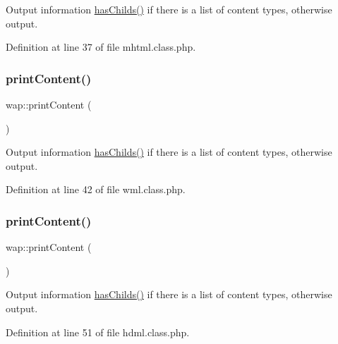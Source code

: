 Output information \hyperlink{classmobileXE_a680f6a6b774bf12be4c67b6a9215f1ea}{has\+Childs()} if there is a list of content types, otherwise output. 



Definition at line 37 of file mhtml.\+class.\+php.

\mbox{\label{classwap_a1edebe2b6a90ec08ab149ad2b2866dbd}} 
\subsubsection{\texorpdfstring{print\+Content()}{printContent()}\hspace{0.1cm}{\footnotesize\ttfamily [2/3]}}
{\footnotesize\ttfamily wap\+::print\+Content (\begin{DoxyParamCaption}{ }\end{DoxyParamCaption})}



Output information \hyperlink{classmobileXE_a680f6a6b774bf12be4c67b6a9215f1ea}{has\+Childs()} if there is a list of content types, otherwise output. 



Definition at line 42 of file wml.\+class.\+php.

\mbox{\label{classwap_a1edebe2b6a90ec08ab149ad2b2866dbd}} 
\subsubsection{\texorpdfstring{print\+Content()}{printContent()}\hspace{0.1cm}{\footnotesize\ttfamily [3/3]}}
{\footnotesize\ttfamily wap\+::print\+Content (\begin{DoxyParamCaption}{ }\end{DoxyParamCaption})}



Output information \hyperlink{classmobileXE_a680f6a6b774bf12be4c67b6a9215f1ea}{has\+Childs()} if there is a list of content types, otherwise output. 



Definition at line 51 of file hdml.\+class.\+php.

\mbox{\label{classwap_a1fd1c1dca866c9b6653499cabf124980}} 
